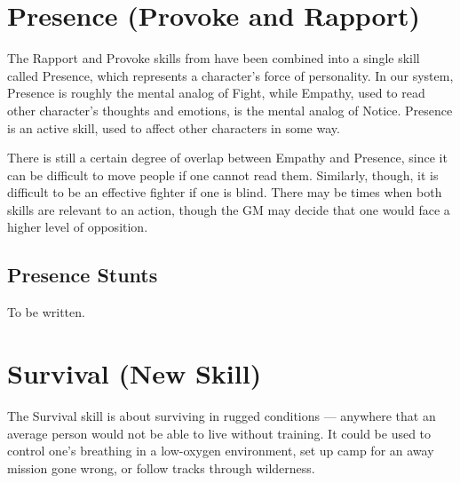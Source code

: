 \documentclass[12pt,titlepage,openany]{book}
\begin{document}
\section{Presence (Provoke and Rapport)}\label{sec:presence}

The Rapport and Provoke skills from \FateCore{} have been combined into a
single skill called Presence, which represents a character's force of
personality. In our system, Presence is roughly the mental analog of Fight,
while Empathy, used to read other character's thoughts and emotions, is the
mental analog of Notice. Presence is an active skill, used to affect other
characters in some way.

There is still a certain degree of overlap between Empathy and Presence, since
it can be difficult to move people if one cannot read them. Similarly, though,
it is difficult to be an effective fighter if one is blind. There may be times
when both skills are relevant to an action, though the GM may decide that one
would face a higher level of opposition.

\begin{SkillActionList}



\end{SkillActionList}

\subsection*{Presence Stunts}\label{subsec:presence-stunts}

To be written.

\section{Survival (New Skill)}\label{sec:survival}

The Survival skill is about surviving in rugged conditions --- anywhere that an
average person would not be able to live without training. It could be used to
control one's breathing in a low-oxygen environment, set up camp for an away
mission gone wrong, or follow tracks through wilderness.
\end{document}
